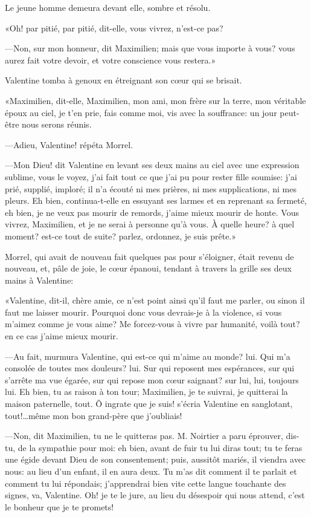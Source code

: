 Le jeune homme demeura devant elle, sombre et résolu. 

«Oh! par pitié, par pitié, dit-elle, vous vivrez, n'est-ce pas? 

—Non, sur mon honneur, dit Maximilien; mais que vous importe à vous? vous aurez fait votre devoir, et votre conscience vous restera.» 

Valentine tomba à genoux en étreignant son cœur qui se brisait. 

«Maximilien, dit-elle, Maximilien, mon ami, mon frère sur la terre, mon véritable époux au ciel, je t'en prie, fais comme moi, vis avec la souffrance: un jour peut-être nous serons réunis. 

—Adieu, Valentine! répéta Morrel. 

—Mon Dieu! dit Valentine en levant ses deux mains au ciel avec une expression sublime, vous le voyez, j'ai fait tout ce que j'ai pu pour rester fille soumise: j'ai prié, supplié, imploré; il n'a écouté ni mes prières, ni mes supplications, ni mes pleurs. Eh bien, continua-t-elle en essuyant ses larmes et en reprenant sa fermeté, eh bien, je ne veux pas mourir de remords, j'aime mieux mourir de honte. Vous vivrez, Maximilien, et je ne serai à personne qu'à vous. À quelle heure? à quel moment? est-ce tout de suite? parlez, ordonnez, je suis prête.» 

Morrel, qui avait de nouveau fait quelques pas pour s'éloigner, était revenu de nouveau, et, pâle de joie, le cœur épanoui, tendant à travers la grille ses deux mains à Valentine: 

«Valentine, dit-il, chère amie, ce n'est point ainsi qu'il faut me parler, ou sinon il faut me laisser mourir. Pourquoi donc vous devrais-je à la violence, si vous m'aimez comme je vous aime? Me forcez-vous à vivre par humanité, voilà tout? en ce cas j'aime mieux mourir. 

—Au fait, murmura Valentine, qui est-ce qui m'aime au monde? lui. Qui m'a consolée de toutes mes douleurs? lui. Sur qui reposent mes espérances, sur qui s'arrête ma vue égarée, sur qui repose mon cœur saignant? sur lui, lui, toujours lui. Eh bien, tu as raison à ton tour; Maximilien, je te suivrai, je quitterai la maison paternelle, tout. Ô ingrate que je suis! s'écria Valentine en sanglotant, tout!\dots même mon bon grand-père que j'oubliais! 

—Non, dit Maximilien, tu ne le quitteras pas. M. Noirtier a paru éprouver, dis-tu, de la sympathie pour moi: eh bien, avant de fuir tu lui diras tout; tu te feras une égide devant Dieu de son consentement; puis, aussitôt mariés, il viendra avec nous: au lieu d'un enfant, il en aura deux. Tu m'as dit comment il te parlait et comment tu lui répondais; j'apprendrai bien vite cette langue touchante des signes, va, Valentine. Oh! je te le jure, au lieu du désespoir qui nous attend, c'est le bonheur que je te promets! 

